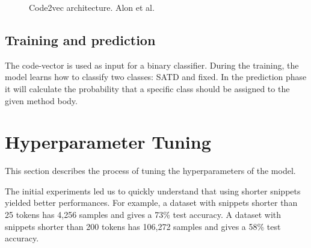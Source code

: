 \begin{figure}
 \centering
 \caption[]{Code2vec architecture. Alon et al. \cite{alon2019code2vec}}
    \label{fig:code2vec_arch}
\end{figure}
 

\subsection{Training and prediction}




The code-vector is used as input for a binary classifier. During the training, the model learns how to classify two classes: SATD and fixed. 
In the prediction phase it will calculate the probability that a specific class should be assigned to the given method body. 

\section{Hyperparameter Tuning}

This section describes the process of tuning the hyperparameters of the model.

The initial experiments led us to quickly understand that using shorter snippets yielded better performances.
For example, a dataset with snippets shorter than 25 tokens has 4,256 samples and gives a 73\% test accuracy.
A dataset with snippets shorter than 200 tokens has 106,272 samples and gives a 58\% test accuracy. 


